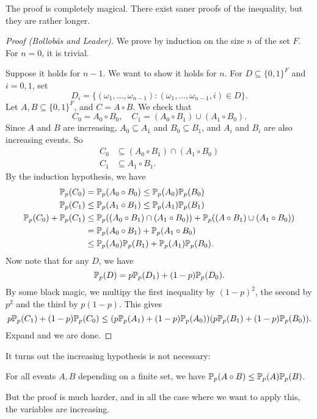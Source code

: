 \documentclass[a4paper]{article}
\begin{document}
The proof is completely magical. There exist saner proofs of the inequality, but they are rather longer.
\begin{proof}[Proof (Bollob\'as and Leader)]
  We prove by induction on the size $n$ of the set $F$. For $n = 0$, it is trivial.

  Suppose it holds for $n - 1$. We want to show it holds for $n$. For $D \subseteq \{0, 1\}^F$ and $i = 0, 1$, set
  \[
    D_i = \{(\omega_1, \ldots, \omega_{n - 1}) : (\omega_1, \ldots, \omega_{n - 1}, i) \in D\}.
  \]
  Let $A, B \subseteq \{0, 1\}^F$, and $C = A \circ B$. We check that
  \[
    C_0 = A_0 \circ B_0,\quad C_1 = (A_0 \circ B_1) \cup (A_1 \circ B_0).
  \]
  Since $A$ and $B$ are increasing, $A_0 \subseteq A_1$ and $B_0 \subseteq B_1$, and $A_i$ and $B_i$ are also increasing events. So
  \begin{align*}
    C_0 &\subseteq (A_0 \circ B_1) \cap (A_1 \circ B_0)\\
    C_1 &\subseteq A_1 \circ B_1.
  \end{align*}
  By the induction hypothesis, we have
  \begin{align*}
    \P_p(C_0) &= \P_p(A_0 \circ B_0) \leq \P_p(A_0) \P_p(B_0)\\
    \P_p(C_1) &\leq \P_p(A_1 \circ B_1) \leq \P_p(A_1) \P_p(B_1)\\
    \P_p(C_0) + \P_p(C_1) &\leq \P_p((A_0 \circ B_1) \cap (A_1 \circ B_0)) + \P_p((A \circ B_1) \cup (A_1 \circ B_0))\\
    &= \P_p(A_0 \circ B_1) + \P_p(A_1 \circ B_0)\\
    &\leq \P_p(A_0) \P_p(B_1) + \P_p(A_1) \P_p(B_0).
  \end{align*}
  Now note that for any $D$, we have
  \[
    \P_p(D) = p \P_p(D_1) + (1 - p) \P_p(D_0).
  \]
  By some black magic, we multipy the first inequality by $(1 - p)^2$, the second by $p^2$ and the third by $p(1 - p)$. This gives
  \[
    p\P_p(C_1) + (1 - p)\P_p(C_0) \leq (p\P_p(A_1) + (1- p)\P_p(A_0))(p\P_p(B_1) + (1 - p) \P_p(B_0)).
  \]
  Expand and we are done.
\end{proof}

It turns out the increasing hypothesis is not necessary:
\begin{thm}[Reimer]
  For all events $A, B$ depending on a finite set, we have $\P_p(A \circ B) \leq \P_p(A) \P_p(B)$.
\end{thm}
But the proof is much harder, and in all the case where we want to apply this, the variables are increasing.
\end{document}
